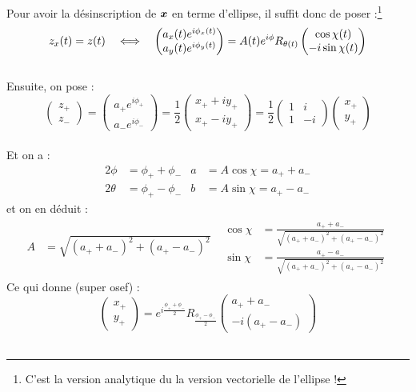 Pour avoir la désinscription de $\bf{x}$ en terme d’ellipse, il suffit donc de poser :\footnote{C'est la version analytique du la version vectorielle de l'ellipse !}
\[z_x(t) = z(t)\quad \Llr\quad \begin{pmatrix}a_x(t) e^{i\phi_x(t)} \\ a_y(t) e^ {i\phi_y(t)}\end{pmatrix} = A(t)e^{i\phi} R_{\theta(t)} \begin{pmatrix} \cos\chi(t) \\ -i\sin\chi(t) \end{pmatrix}\]
\\
Ensuite, on pose :
\[\begin{pmatrix}z_+ \\ z_-\end{pmatrix} = \begin{pmatrix}a_+ e^{i\phi_+} \\ a_- e^{i\phi_-}\end{pmatrix} = \frac{1}{2}\begin{pmatrix}x_+ + iy_+ \\ x_+ - iy_+\end{pmatrix} = \frac{1}{2}\begin{pmatrix}1 & i \\ 1 & -i\end{pmatrix} \begin{pmatrix}x_+ \\ y_+\end{pmatrix}\]
\\
Et on a :
\begin{align*}
	2\phi &= \phi_+ + \phi_-  &  a &= A\cos\chi = a_+ + a_- \\
	2\theta &= \phi_+ - \phi_-  &  b &= A\sin\chi = a_+ - a_- 
\end{align*}
et on en déduit :
\begin{align*}
	A &= \sqrt{(a_+ + a_-)^2 + (a_+ - a_-)^2}  &  \begin{aligned} \cos\chi &= \frac{a_+ + a_- }{\sqrt{(a_+ + a_-)^2 + (a_+ - a_-)^2}}  \\  \sin\chi &= \frac{a_+ - a_- }{\sqrt{(a_+ + a_-)^2 + (a_+ - a_-)^2}}	\end{aligned}
\end{align*}
Ce qui donne \infine (super osef) :
\[\begin{pmatrix}x_+ \\ y_+\end{pmatrix} = e^{i\frac{\phi_+ + \phi_-}{2}} R_{\frac{\phi_+ - \phi_-}{2}} \begin{pmatrix}a_+ + a_- \\ -i(a_+ - a_-)\end{pmatrix}\]
\\

